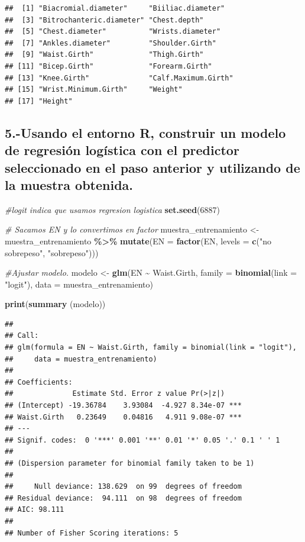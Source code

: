 \documentclass[
]{article}
\newenvironment{Shaded}{\begin{snugshade}}{\end{snugshade}}
\newcommand{\AttributeTok}[1]{\textcolor[rgb]{0.13,0.29,0.53}{#1}}
\newcommand{\CommentTok}[1]{\textcolor[rgb]{0.56,0.35,0.01}{\textit{#1}}}
\newcommand{\DecValTok}[1]{\textcolor[rgb]{0.00,0.00,0.81}{#1}}
\newcommand{\FunctionTok}[1]{\textcolor[rgb]{0.13,0.29,0.53}{\textbf{#1}}}
\newcommand{\NormalTok}[1]{#1}
\newcommand{\OtherTok}[1]{\textcolor[rgb]{0.56,0.35,0.01}{#1}}
\newcommand{\SpecialCharTok}[1]{\textcolor[rgb]{0.81,0.36,0.00}{\textbf{#1}}}
\newcommand{\StringTok}[1]{\textcolor[rgb]{0.31,0.60,0.02}{#1}}
\begin{document}
\begin{verbatim}
##  [1] "Biacromial.diameter"     "Biiliac.diameter"       
##  [3] "Bitrochanteric.diameter" "Chest.depth"            
##  [5] "Chest.diameter"          "Wrists.diameter"        
##  [7] "Ankles.diameter"         "Shoulder.Girth"         
##  [9] "Waist.Girth"             "Thigh.Girth"            
## [11] "Bicep.Girth"             "Forearm.Girth"          
## [13] "Knee.Girth"              "Calf.Maximum.Girth"     
## [15] "Wrist.Minimum.Girth"     "Weight"                 
## [17] "Height"
\end{verbatim}

\subsection{5.-Usando el entorno R, construir un modelo de regresión
logística con el predictor seleccionado en el paso anterior y utilizando
de la muestra
obtenida.}\label{usando-el-entorno-r-construir-un-modelo-de-regresiuxf3n-loguxedstica-con-el-predictor-seleccionado-en-el-paso-anterior-y-utilizando-de-la-muestra-obtenida.}

\begin{Shaded}
\begin{Highlighting}[]
\CommentTok{\#logit indica que usamos regresion logistica}
\FunctionTok{set.seed}\NormalTok{(}\DecValTok{6887}\NormalTok{)}

\CommentTok{\# Sacamos EN y lo convertimos en factor}
\NormalTok{muestra\_entrenamiento }\OtherTok{\textless{}{-}}\NormalTok{ muestra\_entrenamiento }\SpecialCharTok{\%\textgreater{}\%}
    \FunctionTok{mutate}\NormalTok{(}\AttributeTok{EN =} \FunctionTok{factor}\NormalTok{(EN, }\AttributeTok{levels =} \FunctionTok{c}\NormalTok{(}\StringTok{"no sobrepeso"}\NormalTok{, }\StringTok{"sobrepeso"}\NormalTok{)))}

\CommentTok{\#Ajustar modelo.}
\NormalTok{modelo }\OtherTok{\textless{}{-}} \FunctionTok{glm}\NormalTok{(EN }\SpecialCharTok{\textasciitilde{}}\NormalTok{ Waist.Girth, }\AttributeTok{family =} \FunctionTok{binomial}\NormalTok{(}\AttributeTok{link =} \StringTok{"logit"}\NormalTok{), }\AttributeTok{data =}\NormalTok{ muestra\_entrenamiento)}

\FunctionTok{print}\NormalTok{(}\FunctionTok{summary}\NormalTok{ (modelo))}
\end{Highlighting}
\end{Shaded}

\begin{verbatim}
## 
## Call:
## glm(formula = EN ~ Waist.Girth, family = binomial(link = "logit"), 
##     data = muestra_entrenamiento)
## 
## Coefficients:
##              Estimate Std. Error z value Pr(>|z|)    
## (Intercept) -19.36784    3.93084  -4.927 8.34e-07 ***
## Waist.Girth   0.23649    0.04816   4.911 9.08e-07 ***
## ---
## Signif. codes:  0 '***' 0.001 '**' 0.01 '*' 0.05 '.' 0.1 ' ' 1
## 
## (Dispersion parameter for binomial family taken to be 1)
## 
##     Null deviance: 138.629  on 99  degrees of freedom
## Residual deviance:  94.111  on 98  degrees of freedom
## AIC: 98.111
## 
## Number of Fisher Scoring iterations: 5
\end{verbatim}
\end{document}
